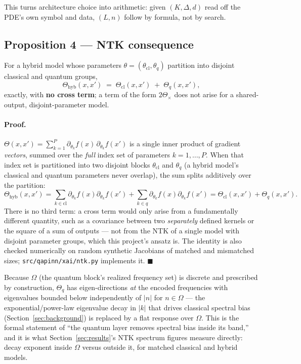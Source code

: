 This turns architecture choice into arithmetic: given $(K,\Delta,d)$ read off the PDE's own
symbol and data, $(L,n)$ follow by formula, not by search.

\subsection{Proposition 4 --- NTK consequence}
\label{sec:prop4}

\begin{proposition}
For a hybrid model whose parameters $\theta=(\theta_{\mathrm{cl}},\theta_q)$ partition into
disjoint classical and quantum groups,
\[
  \boxed{\Theta_{\mathrm{hyb}}(x,x') \;=\; \Theta_{\mathrm{cl}}(x,x') \;+\; \Theta_q(x,x'),}
\]
exactly, with \textbf{no cross term}; a term of the form $2\Theta_\times$ does not arise
for a shared-output, disjoint-parameter model.
\end{proposition}

\paragraph{Proof.} $\Theta(x,x') = \sum_{k=1}^{P}
\partial_{\theta_k}f(x)\,\partial_{\theta_k}f(x')$ is a single inner product of gradient
\emph{vectors}, summed over the \emph{full} index set of parameters $k=1,\dots,P$. When
that index set is partitioned into two disjoint blocks $\theta_{\mathrm{cl}}$ and
$\theta_q$ (a hybrid model's classical and quantum parameters never overlap), the sum
splits additively over the partition:
\[
  \Theta_{\mathrm{hyb}}(x,x') = \sum_{k\in\mathrm{cl}} \partial_{\theta_k}f(x)\partial_{\theta_k}f(x')
  + \sum_{k\in q} \partial_{\theta_k}f(x)\partial_{\theta_k}f(x')
  = \Theta_{\mathrm{cl}}(x,x') + \Theta_q(x,x').
\]
There is no third term: a cross term would only arise from a fundamentally different
quantity, such as a covariance between two \emph{separately} defined kernels or the square
of a sum of outputs --- not from the NTK of a single model with disjoint parameter groups,
which this project's ansatz is. The identity is also checked numerically on random
synthetic Jacobians of matched and mismatched sizes; \texttt{src/qapinn/xai/ntk.py}
implements it. $\blacksquare$

Because $\Omega$ (the quantum block's realized frequency set) is discrete and prescribed
by construction, $\Theta_q$ has eigen-directions \emph{at} the encoded frequencies with
eigenvalues bounded below independently of $|n|$ for $n\in\Omega$ --- the exponential/power-law
eigenvalue decay in $|k|$ that drives classical spectral bias (Section~\ref{sec:background}) is
replaced by a flat response over $\Omega$. This is the formal statement of ``the quantum
layer removes spectral bias inside its band,'' and it is what Section~\ref{sec:results}'s NTK
spectrum figures measure directly: decay exponent inside $\Omega$ versus outside it, for
matched classical and hybrid models.

